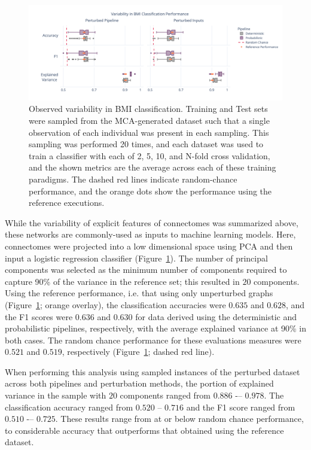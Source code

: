 \documentclass[fleqn,10pt]{SelfArx} %
\begin{document}
\begin{figure}[ht]\centering
\includegraphics[width=\linewidth]{figures/fig3_bmi_classification.pdf}
\caption{Observed variability in BMI classification. Training and Test sets were sampled from the MCA-generated dataset
such that a single observation of each individual was present in each sampling. This sampling was performed 20 times,
and each dataset was used to train a classifier with each of 2, 5, 10, and N-fold cross validation, and the shown
metrics are the average across each of these training paradigms. The dashed red lines indicate random-chance
performance, and the orange dots show the performance using the reference executions.}
\label{fig:bmi}
\end{figure}

While the variability of explicit features of connectomes was summarized above, these networks are commonly-used as
inputs to machine learning models. Here, connectomes were projected into a low dimensional space using PCA and then
input a logistic regression classifier (Figure~\ref{fig:bmi}). The number of principal components was selected as the
minimum number of components required to capture 90\% of the variance in the reference set; this resulted in $20$
components. Using the reference performance, i.e. that using only unperturbed graphs (Figure~\ref{fig:bmi}; orange
overlay), the classification accuracies were $0.635$ and $0.628$, and the F1 scores were $0.636$ and $0.630$ for data
derived using the deterministic and probabilistic pipelines, respectively, with the average explained variance at 90\%
in both cases. The random chance performance for these evaluations measures were $0.521$ and $0.519$, respectively
(Figure~\ref{fig:bmi}; dashed red line).

When performing this analysis using sampled instances of the perturbed dataset across both pipelines and perturbation
methods, the portion of explained variance in the sample with $20$ components ranged from $0.886$ -– $0.978$. The
classification accuracy ranged from $0.520$ – $0.716$ and the F1 score ranged from $0.510$ -– $0.725$. These results
range from at or below random chance performance, to considerable accuracy that outperforms that obtained using the
reference dataset.
\end{document}

